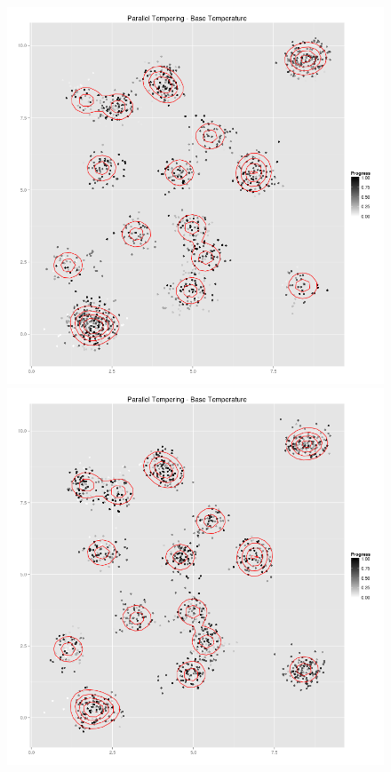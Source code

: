 \begin{figure}
	\begin{minipage}[b]{.5\linewidth}
		\centering \includegraphics[scale=.25]{./img/PT_simululation_base_temperature_2000_steps_strategy_1_try_1.png}
	\end{minipage}%
	\begin{minipage}[b]{.5\linewidth}
		\centering \includegraphics[scale=.25]{./img/PT_simululation_base_temperature_2000_steps_strategy_2_try_1.png}

\end{minipage}
\end{figure}
